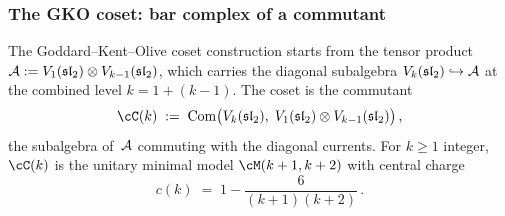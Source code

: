 \subsubsection{The GKO coset: bar complex of a commutant}%
\label{subsubsec:gko-coset-bar}%
%
%

The Goddard--Kent--Olive coset construction starts from the
tensor product
$\mathcal{A} := V_1(\mathfrak{sl}_2) \otimes V_{k-1}(\mathfrak{sl}_2)$,
which carries the diagonal subalgebra
$V_k(\mathfrak{sl}_2) \hookrightarrow \mathcal{A}$
at the combined level $k = 1 + (k{-}1)$. The coset is the
commutant
\begin{equation}\label{eq:gko-coset-def}
\cC(k)
\;:=\;
\mathrm{Com}\bigl(
 V_k(\mathfrak{sl}_2),\;
 V_1(\mathfrak{sl}_2) \otimes V_{k-1}(\mathfrak{sl}_2)
\bigr)\,,
\end{equation}
the subalgebra of~$\mathcal{A}$ commuting with the diagonal currents.
For $k \ge 1$ integer, $\cC(k)$ is the unitary minimal model
$\cM(k+1, k+2)$ with central charge
\begin{equation}\label{eq:gko-central-charge}
c(k) \;=\; 1 - \frac{6}{(k+1)(k+2)}\,.
\end{equation}

